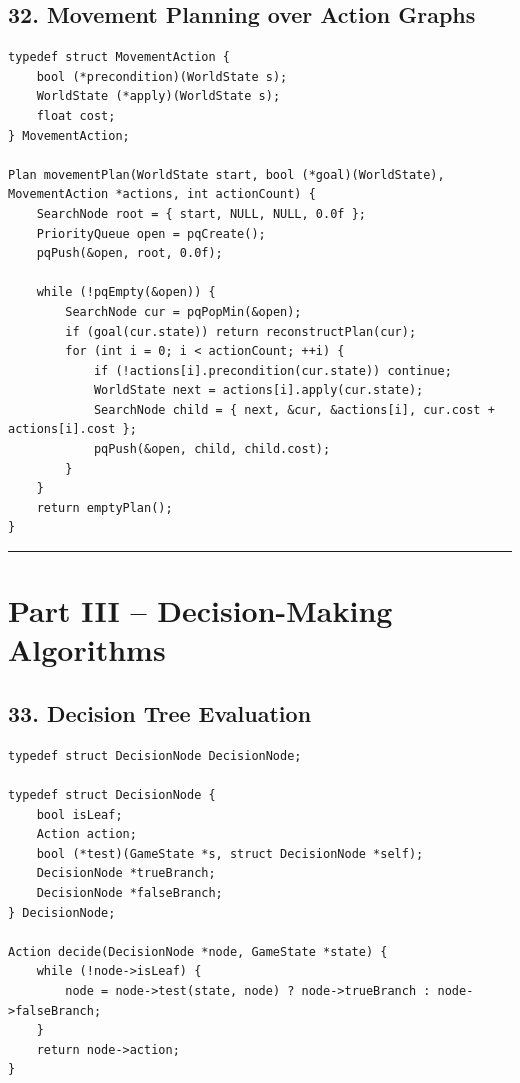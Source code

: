 \documentclass[10pt,letterpaper]{article}
\begin{document}
\subsection*{32. Movement Planning over Action Graphs}
{}

\begin{verbatim}
typedef struct MovementAction {
    bool (*precondition)(WorldState s);
    WorldState (*apply)(WorldState s);
    float cost;
} MovementAction;

Plan movementPlan(WorldState start, bool (*goal)(WorldState), MovementAction *actions, int actionCount) {
    SearchNode root = { start, NULL, NULL, 0.0f };
    PriorityQueue open = pqCreate();
    pqPush(&open, root, 0.0f);

    while (!pqEmpty(&open)) {
        SearchNode cur = pqPopMin(&open);
        if (goal(cur.state)) return reconstructPlan(cur);
        for (int i = 0; i < actionCount; ++i) {
            if (!actions[i].precondition(cur.state)) continue;
            WorldState next = actions[i].apply(cur.state);
            SearchNode child = { next, &cur, &actions[i], cur.cost + actions[i].cost };
            pqPush(&open, child, child.cost);
        }
    }
    return emptyPlan();
}
\end{verbatim}

\medskip\hrule\medskip

\clearpage
\section*{Part III -- Decision-Making Algorithms}

\subsection*{33. Decision Tree Evaluation}
{}

\begin{verbatim}
typedef struct DecisionNode DecisionNode;

typedef struct DecisionNode {
    bool isLeaf;
    Action action;
    bool (*test)(GameState *s, struct DecisionNode *self);
    DecisionNode *trueBranch;
    DecisionNode *falseBranch;
} DecisionNode;

Action decide(DecisionNode *node, GameState *state) {
    while (!node->isLeaf) {
        node = node->test(state, node) ? node->trueBranch : node->falseBranch;
    }
    return node->action;
}
\end{verbatim}
\end{document}
